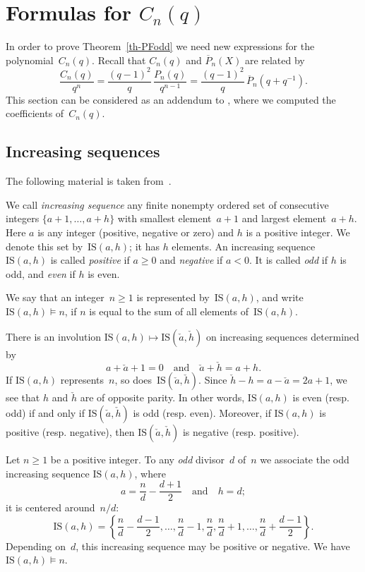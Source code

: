 \documentclass[11pt, a4paper]{amsart}
\theoremstyle{definition}
\newcommand\Pg{\overline{P}}
\newcommand\IS{\mathrm{IS}}
\numberwithin{equation}{section}
\begin{document}
\section{Formulas for $C_n(q)$}\label{sec-Cnq}

In order to prove Theorem~\ref{th-PFodd} we need new expressions for the polynomial~$C_n(q)$.
Recall that $C_n(q)$ and $\Pg_n(X)$ are related by
\begin{equation*}
\frac{C_n(q)}{q^n} = \frac{(q-1)^2}{q} \, \frac{P_n(q)}{q^{n-1}} = \frac{(q-1)^2}{q} \, \Pg_n(q + q^{-1}) .
\end{equation*}
This section can be considered as an addendum to \cite{KR3},
where we computed the coefficients of~$C_n(q)$. 

\subsection{Increasing sequences}\label{ssec-IS}

The following material is taken from~\cite{Ma}.

We call \emph{increasing sequence} any finite nonempty ordered set of consecutive integers $\{ a+1, \ldots, a+h\}$ 
with smallest element~$a+1$ and largest element~$a+h$.
Here $a$ is any integer (positive, negative or zero) and $h$ is a positive integer. We denote this set by~$\IS(a,h)$;
it has $h$ elements. An increasing sequence~$\IS(a,h)$ is called \emph{positive}  if $a\geq 0$
and \emph{negative} if $a < 0$.
It is called \emph{odd} if $h$ is odd, and \emph{even} if $h$ is even.

We say that an integer~$n \geq 1$ is represented by~$\IS(a,h)$, and write $\IS(a,h) \models n$, if $n$ is equal to the sum
of all elements of~$\IS(a,h)$.

There is an involution $\IS(a,h) \mapsto \IS(\check{a},\check{h})$ on increasing sequences determined by
\begin{equation}\label{def-invIS}
a + \check{a} +1 = 0 \quad \text{and} \quad \check{a} + \check{h} = a + h.
\end{equation}
If $\IS(a,h)$ represents~$n$, so does~$\IS(\check{a},\check{h})$. 
Since $\check{h} - h = a - \check{a} = 2a + 1$, we see that $h$ and $\check{h}$ are of opposite parity.
In other words, $\IS(a,h)$ is even (resp. odd) if and only if $\IS(\check{a},\check{h})$ is odd (resp. even).
Moreover, if $\IS(a,h)$ is positive (resp. negative), then $\IS(\check{a},\check{h})$ is negative (resp. positive).

Let $n \geq 1$ be a positive integer.
To any \emph{odd} divisor~$d$ of~$n$ we associate the odd increasing sequence $\IS(a,h)$, where 
\begin{equation}\label{eq-ah}
a = \frac{n}{d} - \frac{d+1}{2}
\quad\text{and}\quad 
h = d;
\end{equation}
it is centered around~$n/d$:
\begin{equation}\label{def-ISd}
\IS(a,h) = \left\{ \frac{n}{d} - \frac{d-1}{2}, \ldots, \frac{n}{d} -1, \frac{n}{d}, \frac{n}{d} +1, \ldots, \frac{n}{d} + \frac{d-1}{2} \right\}.
\end{equation}
Depending on~$d$, this increasing sequence may be positive or negative. We have $\IS(a,h) \models n$.
\end{document}
